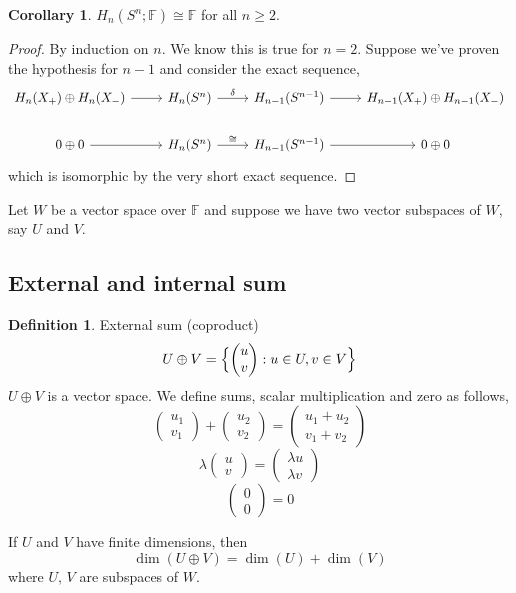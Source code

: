 \documentclass[a4paper,14pt]{extarticle}
\theoremstyle{definition}
\newtheorem*{definition}{Definition}
\newtheorem*{corollary}{Corollary}
\begin{document}
\begin{corollary}
	$H_n(S^n;\mathbb{F})\cong\mathbb{F}$ for all $n\geq 2$.
\end{corollary}

\begin{proof}
	By induction on $n$. We know this is true for $n=2$. Suppose we've
	proven the hypothesis for $n-1$ and consider the exact sequence,
	\[
	\begin{tikzcd}
		H_n(X_+)\oplus H_n(X_-)\arrow{r} & H_n(S^n)\arrow{r}
		{\delta} & H_{n-1}(S^{n-1})
		\arrow{r} & H_{n-1}(X_+)\oplus H_{n-1}(X_-) \\
		0\oplus 0\arrow{r} & H_n(S^n)\arrow{r}{\cong} & H_{n-1}(S^{n-1})
		\arrow{r} & 0\oplus 0
	\end{tikzcd}
	\]
	which is isomorphic by the very short exact sequence.
\end{proof}

Let $W$ be a vector space over $\mathbb{F}$ and suppose we have two
vector subspaces of $W$, say $U$ and $V$.

\subsection{External and internal sum}
\begin{definition}{External sum (coproduct)}
	\[U\oplus V=\Bigl\{\begin{pmatrix}u \\ v\end{pmatrix}: u\in U, v\in V
		\Bigr\}\]
	$U\oplus V$ is a vector space. We define sums, scalar multiplication
	and zero as follows,
	\[\begin{pmatrix}
		u_1\\v_1
	\end{pmatrix}+\begin{pmatrix}
		u_2\\v_2
	\end{pmatrix}=
	\begin{pmatrix}
		u_1+u_2\\v_1+v_2
	\end{pmatrix}\]
	\[\lambda\begin{pmatrix}
		u\\v
	\end{pmatrix}=\begin{pmatrix}
		\lambda u\\ \lambda v
	\end{pmatrix}\]
	\[\begin{pmatrix}
		0\\0
	\end{pmatrix} = 0
	\]
\end{definition}
If $U$ and $V$ have finite dimensions, then 
\[\dim(U\oplus V)=\dim(U)+\dim(V)\] where $U, \,V$ are subspaces of $W$.
\end{document}
